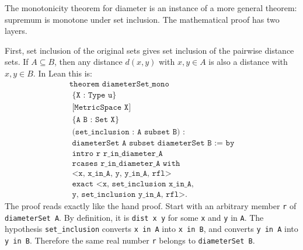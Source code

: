 \begin{remark*}
The monotonicity theorem for diameter is an instance of a more general theorem:
supremum is monotone under set inclusion. The mathematical proof has two
layers.

First, set inclusion of the original sets gives set inclusion of the pairwise
distance sets. If \(A \subseteq B\), then any distance \(d(x,y)\) with
\(x,y \in A\) is also a distance with \(x,y \in B\). In Lean this is:
\[
\begin{gathered}
  \texttt{theorem diameterSet\_mono}\\
  \texttt{\ \ \ \ \{X : Type u\}}\\
  \texttt{\ \ \ \ [MetricSpace X]}\\
  \texttt{\ \ \ \ \{A B : Set X\}}\\
  \texttt{\ \ \ \ (set\_inclusion : A subset B) :}\\
  \texttt{\ \ \ \ diameterSet A subset diameterSet B := by}\\
  \texttt{\ \ intro r r\_in\_diameter\_A}\\
  \texttt{\ \ rcases r\_in\_diameter\_A with}\\
  \texttt{\ \ \ \ <x, x\_in\_A, y, y\_in\_A, rfl>}\\
  \texttt{\ \ exact <x, set\_inclusion x\_in\_A,}\\
  \texttt{\ \ \ \ y, set\_inclusion y\_in\_A, rfl>.}
\end{gathered}
\]
The proof reads exactly like the hand proof. Start with an arbitrary member
\texttt{r} of \texttt{diameterSet A}. By definition, it is
\texttt{dist x y} for some \texttt{x} and \texttt{y} in \texttt{A}. The
hypothesis \texttt{set\_inclusion} converts \texttt{x in A} into
\texttt{x in B}, and converts \texttt{y in A} into \texttt{y in B}. Therefore
the same real number \texttt{r} belongs to \texttt{diameterSet B}.


\end{remark*}
